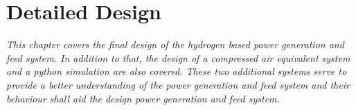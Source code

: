 \chapter{Detailed Design}%
\label{chap:detailed design}%
\emph{This chapter covers the final design of the hydrogen based power generation and feed system. In addition to that, the design of a compressed air equivalent system and a python simulation are also covered. These two additional systems serve to provide a better understanding of the power generation and feed system and their behaviour shall aid the design power generation and feed system.}

\newpage



\clearpage
